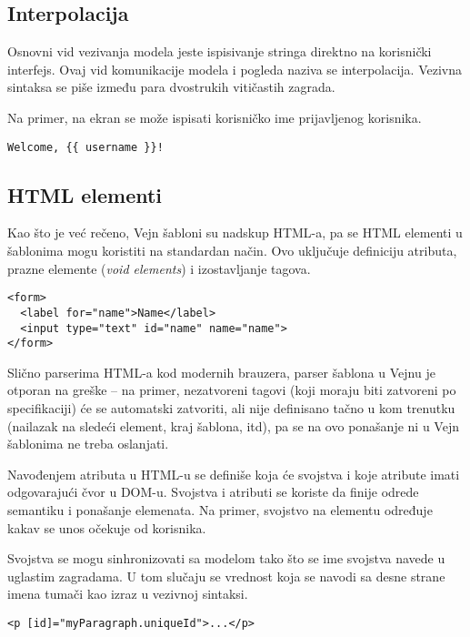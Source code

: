 \subsection{Interpolacija}

Osnovni vid vezivanja modela jeste ispisivanje stringa direktno na korisnički interfejs.
Ovaj vid komunikacije modela i pogleda naziva se interpolacija.
Vezivna sintaksa se piše između para dvostrukih vitičastih zagrada.

Na primer, na ekran se može ispisati korisničko ime prijavljenog korisnika.

\begin{verbatim}
Welcome, {{ username }}!
\end{verbatim}

\subsection{HTML elementi}

Kao što je već rečeno, Vejn šabloni su nadskup HTML-a, pa se HTML elementi u šablonima mogu koristiti na standardan način.
Ovo uključuje definiciju atributa, prazne elemente (\textsl{void elements}) i izostavljanje tagova.

\begin{verbatim}
<form>
  <label for="name">Name</label>
  <input type="text" id="name" name="name">
</form>
\end{verbatim}

Slično parserima HTML-a kod modernih brauzera, parser šablona u Vejnu je otporan na greške -- na primer, nezatvoreni tagovi (koji moraju biti zatvoreni po specifikaciji) će se automatski zatvoriti, ali nije definisano tačno u kom trenutku (nailazak na sledeći element, kraj šablona, itd), pa se na ovo ponašanje ni u Vejn šablonima ne treba oslanjati.

Navođenjem atributa u HTML-u se definiše koja će svojstva i koje atribute imati odgovarajući čvor u DOM-u.
Svojstva i atributi se koriste da finije odrede semantiku i ponašanje elemenata.
Na primer, svojstvo  na  elementu određuje kakav se unos očekuje od korisnika.

Svojstva se mogu sinhronizovati sa modelom tako što se ime svojstva navede u uglastim zagradama.
U tom slučaju se vrednost koja se navodi sa desne strane imena tumači kao izraz u vezivnoj sintaksi.

\begin{verbatim}
<p [id]="myParagraph.uniqueId">...</p>
\end{verbatim}

